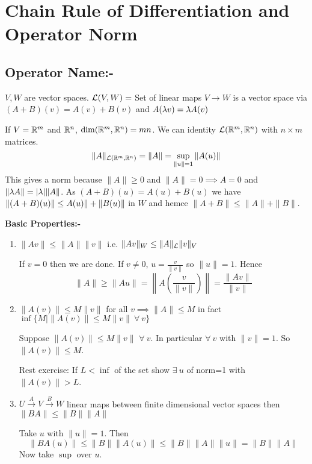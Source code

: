 \chapter{Chain Rule of Differentiation and Operator Norm}
\section{Operator Name:-}
$V,W$ are vector spaces. $\mathcal{L}(V,W)=$ Set of linear maps $V\to W$ is a vector space via $(A+B)(v)=A(v)+B(v)$ and $A(\lambda v)=\lambda A(v)$

If $V=\mathbb{R}^m$ and $\mathbb{R}^n$, $\dim (\mathbb{R}^m,\mathbb{R}^n)=mn$. We can identity $\mathcal{L}(\mathbb{R}^m,\mathbb{R}^n)$ with $n\times m$ matrices. $$\|A\|_{\mathcal{L}(\mathbb{R}^m,\mathbb{R}^n)}=\|A\|=\sup\limits_{\|u\|=1} \|A(u)\|$$This gives a norm because $\|A\|\geq 0$ and $\|A\|=0\implies A=0$ and  $\|\lambda A\|=|\lambda|\|A\|$. As  $(A+B)(u)=A(u)+B(u)$ we have $\|(A+B)(u)\|\leq \\A(u)\|+\|B(u)\|$ in $W$ and hemce $\|A+B\|\leq \|A\|+\|B\|$.

\textbf{Basic Properties:-}
\begin{enumerate}
	\item $\|Av\|\leq \|A\| \|v\|$ i.e. $\|Av\|_W\leq \|A\|_{\mathcal{L}}\|v\|_V$
	\begin{myproof}
		If $v=0$ then we are done. If $v\neq 0$, $u=\frac{v}{\|v\|}$ so $\|u\|=1$. Hence $$\|A\|\geq \|Au\|=\left\|A\left(\frac{v}{\|v\|}\right)\right\|=\frac{\|Av\|}{\|v\|}$$
	\end{myproof}
\item $\|A(v)\|\leq M\|v\|$ for all $v\implies \|A\|\leq M$ in fact $\inf\{M\mid \|A(v)\|\leq M\|v\|\ \forall\ v\}$
\begin{myproof}
	Suppose $\|A(v)\|\leq M\|v\|$ $\forall\ v$. In particular $\forall\ v$ with $\|v\|=1$. So $\|A(v)\|\leq M$.
	
	Rest exercise: If $L<\inf$ of the set  show $\exists \ u$ of norm=1 with $\|A(v)\| >L$.
\end{myproof}
\item $U\xrightarrow{A}V\xrightarrow{B}W$ linear maps between finite dimensional vector spaces  then $\|BA\|\leq \|B\|\|A\|$
\begin{myproof}
	Take $u$ with $\|u\|=1$. Then $$\|BA(u)\|\leq \|B\|\|A(u)\|\leq \|B\|\|A\|\|u\|=\|B\|\|A\|$$Now take $\sup$ over $u$.
\end{myproof}
\end{enumerate}

